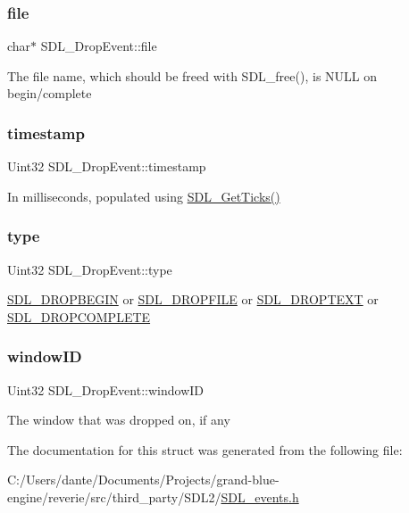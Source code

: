\subsubsection{\texorpdfstring{file}{file}}
{\footnotesize\ttfamily char$\ast$ S\+D\+L\+\_\+\+Drop\+Event\+::file}

The file name, which should be freed with S\+D\+L\+\_\+free(), is N\+U\+LL on begin/complete \mbox{\label{struct_s_d_l___drop_event_a02d2c81bb22db632a40cd0021ff751ab}} 
\subsubsection{\texorpdfstring{timestamp}{timestamp}}
{\footnotesize\ttfamily Uint32 S\+D\+L\+\_\+\+Drop\+Event\+::timestamp}

In milliseconds, populated using \mbox{\hyperlink{_s_d_l__timer_8h_a0b9bc71d6287e0ffafdc3419760fe2b3}{S\+D\+L\+\_\+\+Get\+Ticks()}} \mbox{\label{struct_s_d_l___drop_event_a5ea27cfaa5f8d4940e9a69b68b3cc035}} 
\subsubsection{\texorpdfstring{type}{type}}
{\footnotesize\ttfamily Uint32 S\+D\+L\+\_\+\+Drop\+Event\+::type}

\mbox{\hyperlink{_s_d_l__events_8h_a3b589e89be6b35c02e0dd34a55f3fccaa0809886c132aaf734fff6f2abf466912}{S\+D\+L\+\_\+\+D\+R\+O\+P\+B\+E\+G\+IN}} or \mbox{\hyperlink{_s_d_l__events_8h_a3b589e89be6b35c02e0dd34a55f3fccaad9238862d7aeaebff88be6453ee0fbab}{S\+D\+L\+\_\+\+D\+R\+O\+P\+F\+I\+LE}} or \mbox{\hyperlink{_s_d_l__events_8h_a3b589e89be6b35c02e0dd34a55f3fccaa1d97f901333e40b0ccc4dff1a319213f}{S\+D\+L\+\_\+\+D\+R\+O\+P\+T\+E\+XT}} or \mbox{\hyperlink{_s_d_l__events_8h_a3b589e89be6b35c02e0dd34a55f3fccaaa83e80a89d5c4ff14889d07dddc402ef}{S\+D\+L\+\_\+\+D\+R\+O\+P\+C\+O\+M\+P\+L\+E\+TE}} \mbox{\label{struct_s_d_l___drop_event_a8cecd2178cdc04118bf852e7cf7bf647}} 
\subsubsection{\texorpdfstring{windowID}{windowID}}
{\footnotesize\ttfamily Uint32 S\+D\+L\+\_\+\+Drop\+Event\+::window\+ID}

The window that was dropped on, if any 

The documentation for this struct was generated from the following file\+:\begin{DoxyCompactItemize}
\item 
C\+:/\+Users/dante/\+Documents/\+Projects/grand-\/blue-\/engine/reverie/src/third\+\_\+party/\+S\+D\+L2/\mbox{\hyperlink{_s_d_l__events_8h}{S\+D\+L\+\_\+events.\+h}}\end{DoxyCompactItemize}
